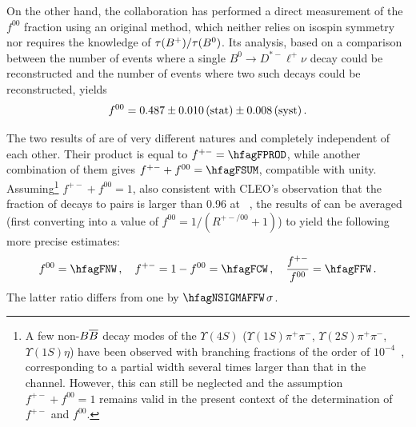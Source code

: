 On the other hand, the \babar collaboration has 
performed a direct measurement of the $f^{00}$ fraction 
using an original method, which neither relies on isospin symmetry nor requires 
the knowledge of $\tau(B^+)/\tau(B^0)$. Its analysis, 
based on a comparison between the number of events where a single 
$B^0 \to D^{*-} \ell^+ \nu$ decay could be reconstructed and the number 
of events where two such decays could be reconstructed, yields~\cite{Aubert:2005bq}
\begin{equation}
f^{00}= 0.487 \pm 0.010\,\mbox{(stat)} \pm 0.008\,\mbox{(syst)} \,.
\labe{fzerozero}
\end{equation}

The two results of  are of very different natures 
and completely independent of each other. 
Their product is equal to $f^{+-} = \hfagFPROD$, 
while another combination of them gives $f^{+-} + f^{00}= \hfagFSUM$, 
compatible with unity.
Assuming\footnote{A few non-$\B\bar{B}$
decay modes of the $\Upsilon(4S)$ 
($\Upsilon(1S)\pi^+\pi^-$,
$\Upsilon(2S)\pi^+\pi^-$, $\Upsilon(1S)\eta$) 
have been observed with branching fractions
of the order of $10^{-4}$~\cite{Aubert:2006bm,*Sokolov:2006sd,*Aubert_mod:2008bv},
corresponding to a partial
width several times larger than that in the \ee channel.
However, this can still be
neglected and the assumption $f^{+-}+f^{00}=1$ remains valid
in the present context of the determination of $f^{+-}$ and $f^{00}$.}
 $f^{+-}+f^{00}= 1$, also consistent with 
CLEO's observation that the fraction of \Ups decays 
to \BB pairs is larger than 0.96 at ~\cite{Barish:1995cx},
the results of 
can be averaged (first converting  
into a value of $f^{00}=1/(R^{+-/00}+1)$) 
to yield the following more precise estimates:
\begin{equation}
f^{00} = \hfagFNW  \,,~~~ f^{+-} = 1 -f^{00} =  \hfagFCW \,,~~~
\frac{f^{+-}}{f^{00}} =  \hfagFFW \,.
\end{equation}
The latter ratio differs from one by $\hfagNSIGMAFFW\,\sigma$.


\newcommand{\fsfive}{\ensuremath{f^{\Upsfive}_{s}}}
\newcommand{\fudfive}{\ensuremath{f^{\Upsfive}_{u,d}}}
\newcommand{\fnBfive}{\ensuremath{f^{\Upsfive}_{B\!\!\!\!/}}}

